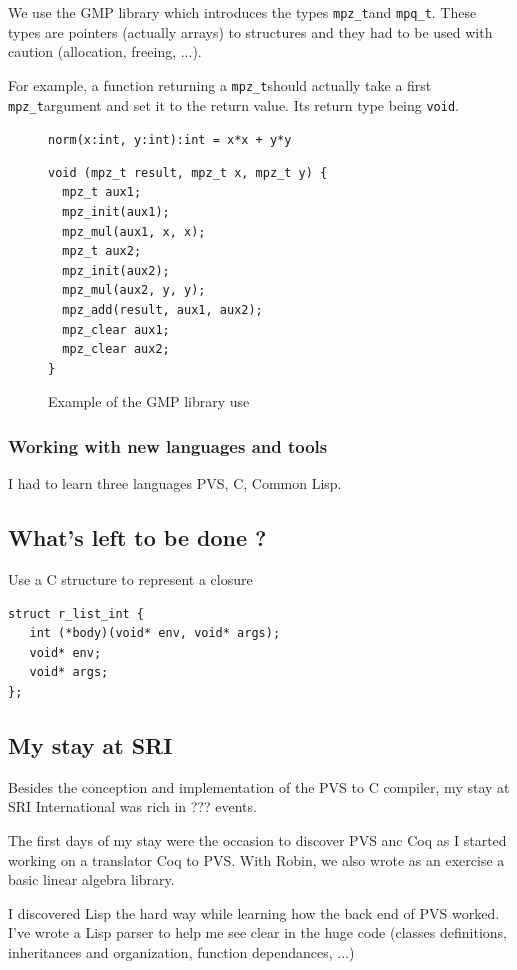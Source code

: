 \documentclass[12pt,a4paper,titlepage]{article}
\newcommand{\cl}[1]{\texttt{#1}}
\newcommand{\mpzt}{\texttt{mpz\_t}}
\newcommand{\mpqt}{\texttt{mpq\_t}}
\begin{document}
We use the GMP library which introduces the types \mpzt and \mpqt. These types are pointers (actually arrays) to structures and they had to be used with caution (allocation, freeing, ...).

For example, a function returning a \mpzt should actually take a first \mpzt argument and set it to the return value. Its return type being \cl{void}.

\begin{figure}[h!]
\cl{norm(x:int, y:int):int = x*x + y*y}
\begin{lstlisting}
void (mpz_t result, mpz_t x, mpz_t y) {
  mpz_t aux1;
  mpz_init(aux1);
  mpz_mul(aux1, x, x);
  mpz_t aux2;
  mpz_init(aux2);
  mpz_mul(aux2, y, y);
  mpz_add(result, aux1, aux2);
  mpz_clear aux1;
  mpz_clear aux2;
}
\end{lstlisting}
\caption{Example of the GMP library use}
\end{figure}


\subsubsection{Working with new languages and tools}
I had to learn three languages PVS, C, Common Lisp.



\subsection{What's left to be done ?}

Use a C structure to represent a closure
\begin{lstlisting}
struct r_list_int {
   int (*body)(void* env, void* args);
   void* env;
   void* args;
};
\end{lstlisting}



\subsection{My stay at SRI}

Besides the conception and implementation of the PVS to C compiler, my stay at SRI International was rich in ??? events.

The first days of my stay were the occasion to discover PVS anc Coq as I started working on a translator Coq to PVS. With Robin, we also wrote as an exercise a basic linear algebra library.

I discovered Lisp the hard way while learning how the back end of PVS worked. I've wrote a Lisp parser to help me see clear in the huge code (classes definitions, inheritances and organization, function dependances, ...)
\end{document}
